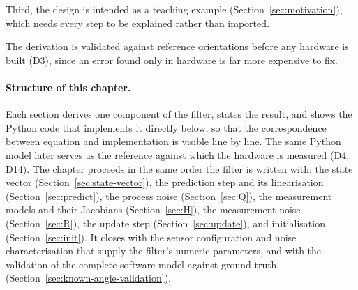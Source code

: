 \documentclass[12pt,a4paper]{article}
\begin{document}
Third, the design is intended as a teaching example
(Section~\ref{sec:motivation}), which needs every step to be
explained rather than imported.

The derivation is validated against reference orientations before
any hardware is built (D3), since an error found only in hardware is
far more expensive to fix.

\paragraph{Structure of this chapter.} Each section derives one
component of the filter, states the result, and shows the Python
code that implements it directly below, so that the correspondence
between equation and implementation is visible line by line. The
same Python model later serves as the reference against which the
hardware is measured (D4, D14). The chapter proceeds in the same order
the filter is written with: the state vector (Section~\ref{sec:state-vector}),
the prediction step and its linearisation
(Section~\ref{sec:predict}), the process noise
(Section~\ref{sec:Q}), the measurement models and their Jacobians
(Section~\ref{sec:H}), the measurement noise (Section~\ref{sec:R}),
the update step (Section~\ref{sec:update}), and initialisation
(Section~\ref{sec:init}). It closes with the sensor configuration
and noise characterisation that supply the filter's numeric
parameters, and with the validation of the complete software model
against ground truth (Section~\ref{sec:known-angle-validation}).
\end{document}
